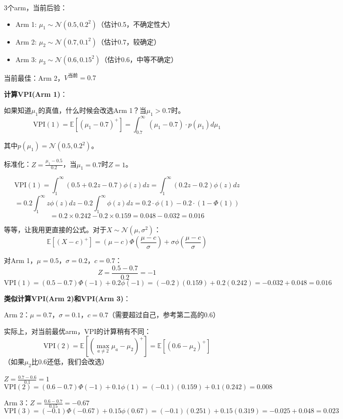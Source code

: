 \documentclass[11pt,a4paper]{article}
\theoremstyle{definition}
\begin{document}
\begin{calculation}[VPI的完整计算]
3个arm，当前后验：
\begin{itemize}
    \item Arm 1: $\mu_1 \sim \mathcal{N}(0.5, 0.2^2)$（估计0.5，不确定性大）
    \item Arm 2: $\mu_2 \sim \mathcal{N}(0.7, 0.1^2)$（估计0.7，较确定）
    \item Arm 3: $\mu_3 \sim \mathcal{N}(0.6, 0.15^2)$（估计0.6，中等不确定）
\end{itemize}

当前最佳：Arm 2，$V^{\text{当前}} = 0.7$

\textbf{计算VPI(Arm 1)}：

如果知道$\mu_1$的真值，什么时候会改选Arm 1？当$\mu_1 > 0.7$时。
\[
\text{VPI}(1) = \mathbb{E}[(\mu_1 - 0.7)^+] = \int_{0.7}^{\infty} (\mu_1 - 0.7) \cdot p(\mu_1) d\mu_1
\]

其中$p(\mu_1) = \mathcal{N}(0.5, 0.2^2)$。

标准化：$Z = \frac{\mu_1 - 0.5}{0.2}$，当$\mu_1 = 0.7$时$Z = 1$。

\[
\text{VPI}(1) = \int_1^{\infty} (0.5 + 0.2z - 0.7) \phi(z) dz = \int_1^{\infty} (0.2z - 0.2) \phi(z) dz
\]
\[
= 0.2 \int_1^{\infty} z\phi(z) dz - 0.2 \int_1^{\infty} \phi(z) dz = 0.2 \cdot \phi(1) - 0.2 \cdot (1 - \Phi(1))
\]
\[
= 0.2 \times 0.242 - 0.2 \times 0.159 = 0.048 - 0.032 = 0.016
\]

等等，让我用更直接的公式。对于$X \sim \mathcal{N}(\mu, \sigma^2)$：
\[
\mathbb{E}[(X - c)^+] = (\mu - c)\Phi\left(\frac{\mu - c}{\sigma}\right) + \sigma \phi\left(\frac{\mu - c}{\sigma}\right)
\]

对Arm 1，$\mu = 0.5$，$\sigma = 0.2$，$c = 0.7$：
\[
Z = \frac{0.5 - 0.7}{0.2} = -1
\]
\[
\text{VPI}(1) = (0.5 - 0.7)\Phi(-1) + 0.2\phi(-1) = (-0.2)(0.159) + 0.2(0.242) = -0.032 + 0.048 = 0.016
\]

\textbf{类似计算VPI(Arm 2)和VPI(Arm 3)}：

Arm 2：$\mu = 0.7$，$\sigma = 0.1$，$c = 0.7$（需要超过自己，参考第二高的0.6）

实际上，对当前最优arm，VPI的计算稍有不同：
\[
\text{VPI}(2) = \mathbb{E}[(\max_{a \neq 2}\hat{\mu}_a - \mu_2)^+] = \mathbb{E}[(0.6 - \mu_2)^+]
\]
（如果$\mu_2$比0.6还低，我们会改选）

$Z = \frac{0.7 - 0.6}{0.1} = 1$
\[
\text{VPI}(2) = (0.6 - 0.7)\Phi(-1) + 0.1\phi(1) = (-0.1)(0.159) + 0.1(0.242) = 0.008
\]

Arm 3：$Z = \frac{0.6 - 0.7}{0.15} = -0.67$
\[
\text{VPI}(3) = (-0.1)\Phi(-0.67) + 0.15\phi(0.67) = (-0.1)(0.251) + 0.15(0.319) = -0.025 + 0.048 = 0.023
\]


\end{calculation}
\end{document}

